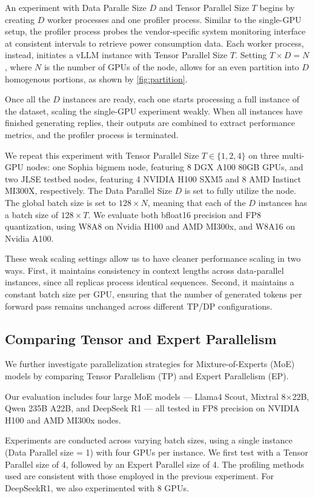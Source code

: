 An experiment with Data Paralle Size $D$ and Tensor Parallel Size $T$ begins by creating $D$ worker processes and one profiler process. Similar to the single-GPU setup, the profiler process probes the vendor-specific system monitoring interface at consistent intervals to retrieve power consumption data.
Each worker process, instead, initiates a vLLM instance with Tensor Parallel Size $T$. Setting $T\times D = N$, where $N$ is the number of GPUs of the node, allows for an even partition into $D$ homogenous portions, as shown by \ref{fig:partition}.

Once all the $D$ instances are ready, each one starts processing a full instance of the dataset, scaling the single-GPU experiment weakly. When all instances have finished generating replies, their outputs are combined to extract performance metrics, and the profiler process is terminated.

We repeat this experiment with Tensor Parallel Size $T \in \{1, 2, 4\}$ on three multi-GPU nodes: one Sophia bigmem node, featuring 8 DGX A100 80GB GPUs, and two JLSE testbed nodes, featuring 4 NVIDIA H100 SXM5 and 8 AMD Instinct MI300X, respectively. The Data Parallel Size $D$ is set to fully utilize the node. 
The global batch size is set to $128 \times N$, meaning that each of the $D$ instances has a batch size of $128\times T$.
We evaluate both bfloat16 precision and FP8 quantization, using W8A8 on Nvidia H100 and AMD MI300x, and W8A16 on Nvidia A100.

These weak scaling settings allow us to have cleaner performance scaling in two ways. First, it maintains consistency in context lengths across data-parallel instances, since all replicas process identical sequences. Second, it maintains a constant batch size per GPU, ensuring that the number of generated tokens per forward pass remains unchanged across different TP/DP configurations.

\subsection{Comparing Tensor and Expert Parallelism}

We further investigate parallelization strategies for Mixture-of-Experts (MoE) models by comparing Tensor Parallelism (TP) and Expert Parallelism (EP).

Our evaluation includes four large MoE models — Llama4 Scout, Mixtral 8×22B, Qwen 235B A22B, and DeepSeek R1 — all tested in FP8 precision on NVIDIA H100 and AMD MI300x nodes.

Experiments are conducted across varying batch sizes, using a single instance (Data Parallel size = 1) with four GPUs per instance. We first test with a Tensor Parallel size of 4, followed by an Expert Parallel size of 4. The profiling methods used are consistent with those employed in the previous experiment. For DeepSeekR1, we also experimented with 8 GPUs.
